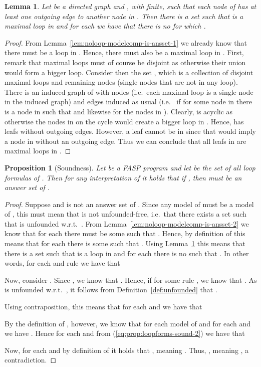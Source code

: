 \documentclass{tlp}
\newtheorem{proposition}{Proposition}
\newtheorem{lemma}{Lemma}
\begin{document}
\begin{lemma}\label{lem:loopforms-sound-1}
 Let  be a directed graph and , with  finite, such that each node of  has at least one outgoing edge to another node in . Then there is a set  such that  is a maximal loop in  and for each  we have that there is no  for which .
\end{lemma}
\begin{proof}
 From Lemma~\ref{lem:noloop-modelcomp-is-ansset-1} we already know that there must be a loop in . Hence, there must also be a maximal loop in . First, remark that maximal loops must of course be disjoint as otherwise their union would form a bigger loop.
 Consider then the set , which is a collection of disjoint maximal loops  and remaining nodes  (single nodes that are not in any loop). There is an induced graph  of  with nodes  (i.e.~each maximal loop is a single node in the induced graph) and edges  induced as usual (i.e.~ if for some node  in  there is a node  in  such that  and likewise for the nodes in ). Clearly,  is acyclic as otherwise the nodes in  on the cycle would create a bigger loop in . Hence,  has leafs without outgoing edges. However, a leaf cannot be in  since that would imply a node in  without an outgoing edge. Thus we can conclude that all leafs in  are maximal loops in .
\end{proof}







\begin{proposition}[Soundness]\label{prop:loopforms-sound}
 Let  be a FASP program and let  be the set of all loop formulas of . Then for any interpretation  of  it holds that if , then  must be an answer set of .
\end{proposition}

\begin{proof}
 Suppose  and  is not an answer set of . Since any model of  must be a model of , this must mean that  is not unfounded-free, i.e.~that there exists a set  such that  is unfounded w.r.t.~. From Lemma~\ref{lem:noloop-modelcomp-is-ansset-2} we know that for each  there must be some  such that . Hence, by definition of  this means that for each  there is some  such that . Using Lemma~\ref{lem:loopforms-sound-1} this means that there is a set  such that  is a loop in  and for each  there is no  such that . In other words, for each  and rule  we have that
  

Now, consider . Since , we know that . Hence, if  for some rule , we know that . As  is unfounded w.r.t.~, it follows from Definition~\ref{def:unfounded} that .

 Using contraposition, this means that for each  and  we have that
  

 By the definition of , however, we know that for each model of  and for each  and  we have . Hence for each  and  from (\ref{eq:prop:loopforms-sound-2}) we have that
  
 Now, for each  and  by definition of  it holds that , meaning . Thus, , meaning , a contradiction.
\end{proof}
\end{document}

